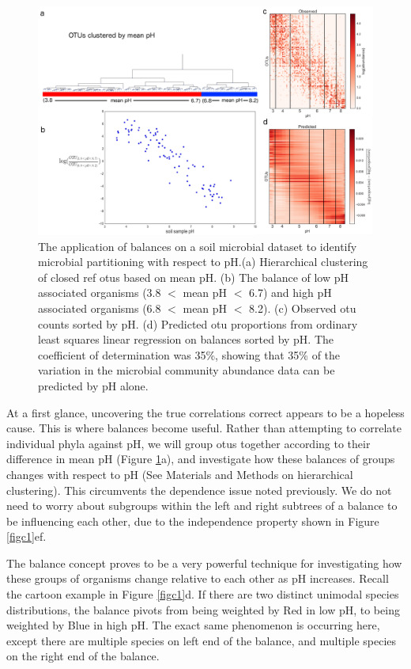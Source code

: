  \begin{figure}[H]
        \centering
        \includegraphics[width=1\textwidth]{ch3/Figure2.pdf}
        \caption[The application of balances on a soil microbial dataset to identify
          microbial partitioning with respect to pH.]
        {The application of balances on a soil microbial dataset to identify microbial partitioning with respect to pH.(a) Hierarchical clustering of closed ref \gls{otu}s based on mean pH. (b) The balance of low pH associated organisms (3.8 $<$ mean pH $<$ 6.7) and high pH associated organisms (6.8 $<$ mean pH $<$ 8.2). (c) Observed \gls{otu} counts sorted by pH. (d) Predicted \gls{otu} proportions from ordinary least squares linear regression on balances sorted by pH. The coefficient of determination was 35\%, showing that 35\% of the variation in the microbial community abundance data can be predicted by pH alone.}
        \label{figc2}
 \end{figure}
 At a first glance, uncovering the true correlations correct appears to be a hopeless cause.  This is where balances become useful.  Rather than attempting to correlate individual phyla against pH, we will group \gls{otu}s together according to their difference in mean pH (Figure \ref{figc2}a), and investigate how these balances of groups changes with respect to pH (See Materials and Methods on hierarchical clustering).  This circumvents the dependence issue noted previously.  We do not need to worry about subgroups within the left and right subtrees of a balance to be influencing each other, due to the independence property shown in Figure \ref{figc1}ef.  \par
 The balance concept proves to be a very powerful technique for investigating how these groups of organisms change relative to each other as pH increases.  Recall the cartoon example in Figure \ref{figc1}d.  If there are two distinct unimodal species distributions, the balance pivots from being weighted by Red in low pH, to being weighted by Blue in high pH.  The exact same phenomenon is occurring here, except there are multiple species on left end of the balance, and multiple species on the right end of the balance.\par
